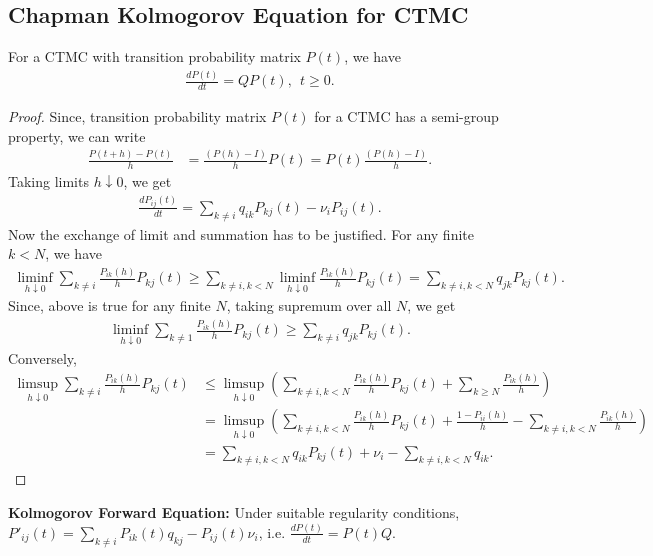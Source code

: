 \documentclass[a4paper,10pt,english]{article}
\begin{document}
\subsection{Chapman Kolmogorov Equation for CTMC}
\begin{thm} For a CTMC with transition probability matrix $P(t)$, we have
\begin{align*}
\frac{dP(t)}{dt}=QP(t), ~~t \geqslant 0.
\end{align*}
\end{thm}
\begin{proof} Since, transition probability matrix $P(t)$ for a CTMC has a semi-group property, 
we can write
\begin{align*}
\frac{P(t+h) - P(t)}{h} &= \frac{(P(h)- I)}{h}P(t) = P(t)\frac{(P(h) - I)}{h}.
\end{align*}
Taking limits $h \downarrow 0$, we get 
\begin{align*}
\frac{dP_{ij}(t)}{dt} = \sum_{k \neq i}q_{ik}P_{kj}(t)-\nu_iP_{ij}(t). 
\end{align*}
Now the exchange of limit and summation has to be justified. For any finite $k < N$, we have
\begin{align*}
\liminf_{h \downarrow 0} \sum_{k \neq i}\frac{P_{ik}(h)}{h}P_{kj}(t) \geq \sum_{k \neq i, k < N}\liminf_{h \downarrow 0}\frac{P_{ik}(h)}{h}P_{kj}(t) = \sum_{k \neq i, k < N}q_{jk}P_{kj}(t).
\end{align*}
Since, above is true for any finite $N$, taking supremum over all $N$, we get 
\begin{align*}
\liminf_{h \downarrow 0} \sum_{k \neq 1}\frac{P_{ik}(h)}{h}P_{kj}(t) \geq \sum_{k \neq i}q_{jk}P_{kj}(t).
\end{align*}
Conversely,
\begin{align*}
\limsup_{h \downarrow 0}\sum_{k \neq i}\frac{P_{ik}(h)}{h}P_{kj}(t) &\leq \limsup_{h \downarrow 0}\left(\sum_{k \neq i, k<N}\frac{P_{ik}(h)}{h}P_{kj}(t)+\sum_{k\geq N}\frac{P_{ik}(h)}{h}\right)\\
& = \limsup_{h \downarrow 0}\left(\sum_{k \neq i, k<N}\frac{P_{ik}(h)}{h}P_{kj}(t)+\frac{1-P_{ii}(h)}{h} -\sum_{k \neq i, k < N}\frac{P_{ik}(h)}{h} \right)\\
&= \sum_{k \neq i, k<N}q_{ik}P_{kj}(t)+\nu_i- \sum_{k \neq i, k < N}q_{ik}. %
\end{align*}
\end{proof}
\begin{thm}
\textbf{Kolmogorov Forward Equation:} Under suitable regularity conditions, $P'_{ij}(t)=\sum_{k \neq i}P_{ik}(t)q_{kj}-P_{ij}(t)\nu_i$, i.e. $\frac{dP(t)}{dt}=P(t)Q$.
\end{thm}
\end{document}
